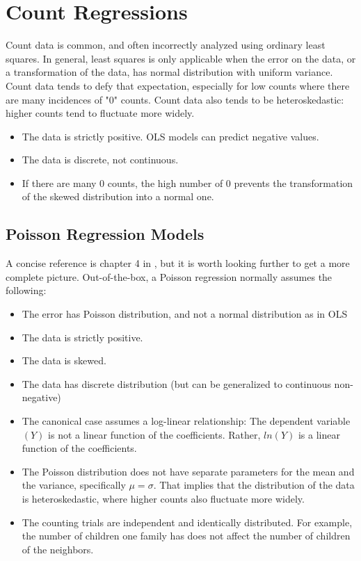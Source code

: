 \section{Count Regressions}

Count data is common, and often incorrectly analyzed using ordinary least squares. In general, least squares is only applicable when the error on the data, or a transformation of the data, has normal distribution with uniform variance. Count data tends to defy that expectation, especially for low counts where there are many incidences of "$0$" counts. Count data also tends to be heteroskedastic: higher counts tend to fluctuate more widely.

\begin{itemize}
\item The data is strictly positive. OLS models can predict negative values.
\item The data is discrete, not continuous.
\item If there are many $0$ counts, the high number of $0$ prevents the transformation of the skewed distribution into a normal one.     
\end{itemize}

\subsection{Poisson Regression Models}
A concise reference is chapter 4 in , but it is worth looking further to get a more complete picture. Out-of-the-box, a Poisson regression normally assumes the following:

\begin{itemize}
\item The error has Poisson distribution, and not a normal distribution as in OLS
\item The data is strictly positive.
\item The data is skewed.
\item The data has discrete distribution (but can be generalized to continuous non-negative)
\item The canonical case assumes a log-linear relationship: The dependent variable $(Y)$ is not a linear function of the coefficients. Rather, $ln(Y)$ is a linear function of the coefficients.
\item The Poisson distribution does not have separate parameters for the mean and the variance, specifically $\mu = \sigma$. That implies that the distribution of the data is heteroskedastic, where higher counts also fluctuate more widely.
\item The counting trials are independent and identically distributed. For example, the number of children one family has does not affect the number of children of the neighbors.
\end{itemize}

